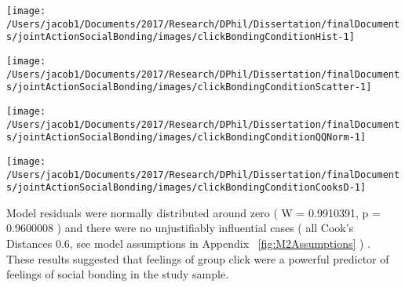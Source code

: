 \documentclass[english]{article}\usepackage[]{graphicx}\usepackage[]{color}
\makeatletter
\def\maxwidth{ %
  \ifdim\Gin@nat@width>\linewidth
    \linewidth
  \else
    \Gin@nat@width
  \fi
}
\newenvironment{knitrout}{}{} %
\newcommand{\pvalue}{p =}
\newcommand{\resdist}{W = }
\newcommand{\cooksD}{Cook's Distances}
\makeatother
\begin{document}
\begin{knitrout}
\color{fgcolor}

{\centering \texttt{[image: /Users/jacob1/Documents/2017/Research/DPhil/Dissertation/finalDocuments/jointActionSocialBonding/images/clickBondingConditionHist-1]} 

}



\end{knitrout}
\begin{knitrout}
\color{fgcolor}

{\centering \texttt{[image: /Users/jacob1/Documents/2017/Research/DPhil/Dissertation/finalDocuments/jointActionSocialBonding/images/clickBondingConditionScatter-1]} 

}



\end{knitrout}
\begin{knitrout}
\color{fgcolor}

{\centering \texttt{[image: /Users/jacob1/Documents/2017/Research/DPhil/Dissertation/finalDocuments/jointActionSocialBonding/images/clickBondingConditionQQNorm-1]} 

}



\end{knitrout}
\begin{knitrout}
\color{fgcolor}

{\centering \texttt{[image: /Users/jacob1/Documents/2017/Research/DPhil/Dissertation/finalDocuments/jointActionSocialBonding/images/clickBondingConditionCooksD-1]} 

}



\end{knitrout}

Model residuals were normally distributed around zero
(
  \resdist
    0.9910391,
  \pvalue
    0.9600008
)
and there were no unjustifiably influential cases
(
all
\cooksD
  0.6, see model assumptions in Appendix  ~\ref{fig:M2Assumptions}
)
.
These results suggested that feelings of group click were a powerful predictor of feelings of social bonding in the study sample.
\end{document}
